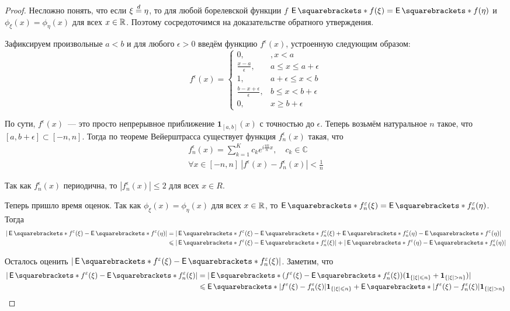 \begin{proof}
	Несложно понять, что если \(\xi \overset{d}{=} \eta\), то для любой борелевской 
	функции \(f\) \(\E{f(\xi)} = \E{f(\eta)}\) и \(\phi_{\xi}(x) = 
	\phi_{\eta}(x)\) для всех \(x \in \mathbb{R}\). Поэтому сосредоточимся на 
	доказательстве обратного утверждения.
	
	Зафиксируем произвольные \(a < b\) и для любого \(\epsilon > 0\) введём 
	функцию \(f^{\epsilon}(x)\), устроенную следующим образом:
	\[
		f^{\epsilon}(x) = \begin{cases}
		0,&, x < a \\
		\frac{x - a}{\epsilon},& a \leq x \leq a + \epsilon \\
		1,& a + \epsilon \leq x < b \\
		\frac{b - x + \epsilon}{\epsilon},& b \leq x < b + \epsilon \\
		0, & x \geq b + \epsilon
		\end{cases}
	\]
	
	По сути, \(f^{\epsilon}(x)\)~--- это просто непрерывное приближение 
	\(\mathbf{1}_{[a, b]}(x)\) с точностью до \(\epsilon\). Теперь возьмём 
	натуральное \(n\) такое, что \([a, b + \epsilon] \subset [-n, n]\). Тогда 
	по теореме Вейерштрасса существует функция \(f_{n}^{\epsilon}(x)\) такая, 
	что
	\begin{gather*}
		f_{n}^{\epsilon}(x) = \sum_{k = 1}^{K} c_{k}e^{i\frac{\pi k}{n}x},\quad 
		c_{k} \in \mathbb{C} \\
		\forall x \in [-n, n]\ |f^{\epsilon}(x) - f_{n}^{\epsilon}(x)| < 
		\frac{1}{n}
	\end{gather*}

	Так как \(f_{n}^{\epsilon}(x)\) периодична, то \(|f_{n}^{\epsilon}(x)| \leq 
	2\) для всех \(x \in R\).
	
	Теперь пришло время оценок. Так как \(\phi_{\xi}(x) = \phi_{\eta}(x)\) для 
	всех \(x \in \mathbb{R}\), то \(\E{f_{n}^{\epsilon}(\xi)} = \E{ 
	f_{n}^{\epsilon}(\eta)}\). Тогда 
	\begin{align*}
		|\E{f^{\epsilon}(\xi)} - \E{f^{\epsilon}(\eta)}| &= 
		|\E{f^{\epsilon}(\xi)} - \E{f_{n}^{\epsilon}(\xi)} + \E{ 
		f_{n}^{\epsilon}(\eta)} - \E{f^{\epsilon}(\eta)}| \\
		&\leq |\E{f^{\epsilon}(\xi)} - \E{f_{n}^{\epsilon}(\xi)}| + 
		|\E{f^{\epsilon}(\eta)} - \E{ f_{n}^{\epsilon}(\eta)}|
	\end{align*}

	Осталось оценить \(|\E{f^{\epsilon}(\xi)} - \E{f_{n}^{\epsilon}(\xi)}|\). 	
	Заметим, что
	\begin{align*}
		|\E{f^{\epsilon}(\xi)} - \E{f_{n}^{\epsilon}(\xi)}| &= 
		|\E{(f^{\epsilon}(\xi)} - \E{f_{n}^{\epsilon}(\xi))(\mathbf{1}_{\{|\xi| 
		\leq n\}} + \mathbf{1}_{\{|\xi| > n\}})}|\\
		&\leq \E{|f^{\epsilon}(\xi) - f_{n}^{\epsilon}(\xi)| 
		\mathbf{1}_{\{|\xi| \leq n\}}} + \E{|f^{\epsilon}(\xi) - 
		f_{n}^{\epsilon}(\xi)| \mathbf{1}_{\{|\xi| > n\}}}
	\end{align*}


\end{proof}
